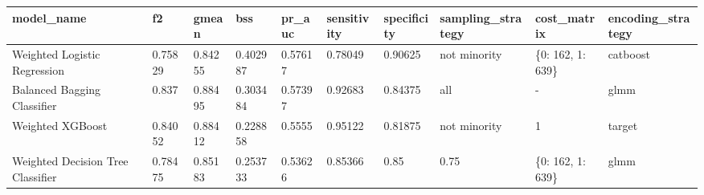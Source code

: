 \begin{tabular}{|l|l|l|l|l|l|l|l|l|l|}
\hline
\textbf{model\_name}              & \textbf{f2} & \textbf{gmean} & \textbf{bss} & \textbf{pr\_auc} & \textbf{sensitivity} & \textbf{specificity} & \textbf{sampling\_strategy} & \textbf{cost\_matrix} & \textbf{encoding\_strategy} \\ \hline
Weighted Logistic Regression      & 0.75829     & 0.84255        & 0.402987     & 0.57617          & 0.78049              & 0.90625              & not minority                & \{0: 162, 1: 639\}    & catboost                    \\ \hline
Balanced Bagging Classifier       & 0.837       & 0.88495        & 0.303484     & 0.57397          & 0.92683              & 0.84375              & all                         & -                     & glmm                        \\ \hline
Weighted XGBoost                  & 0.84052     & 0.88412        & 0.228858     & 0.5555           & 0.95122              & 0.81875              & not minority                & 1                     & target                      \\ \hline
Weighted Decision Tree Classifier & 0.78475     & 0.85183        & 0.253733     & 0.53626          & 0.85366              & 0.85                 & 0.75                        & \{0: 162, 1: 639\}    & glmm                        \\ \hline
\end{tabular}